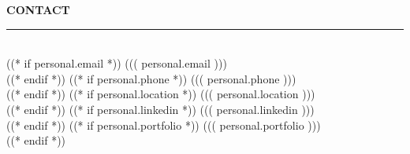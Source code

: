 \documentclass[11pt,a4paper]{article}
\begin{document}
\noindent
{}

\noindent
\begin{minipage}[t]{0.36\textwidth}
\color{white}
\vspace{8mm}
\hspace{6mm}
\begin{minipage}[t]{0.82\textwidth}

\begin{center}
\end{center}

\vspace{8mm}

{\fontsize{11}{13}\selectfont\bfseries\MakeUppercase{Contact}}\\[2pt]
{\color{white!40}\rule{\linewidth}{0.4pt}}\\[8pt]
((* if personal.email *))
{\small\faEnvelope\hspace{8pt}((( personal.email )))}\\[8pt]
((* endif *))
((* if personal.phone *))
{\small\faPhone\hspace{8pt}((( personal.phone )))}\\[8pt]
((* endif *))
((* if personal.location *))
{\small\faMapMarker*\hspace{8pt}((( personal.location )))}\\[8pt]
((* endif *))
((* if personal.linkedin *))
{\small\faLinkedin\hspace{8pt}((( personal.linkedin )))}\\
((* endif *))
((* if personal.portfolio *))
{\small\faGlobe\hspace{8pt}((( personal.portfolio )))}\\
((* endif *))

\vspace{9pt}


\end{minipage}
\end{minipage}
\end{document}
